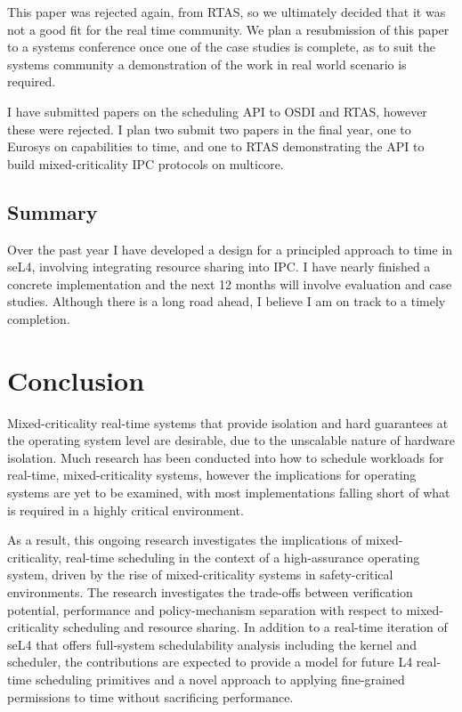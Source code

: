 This paper was rejected again, from \gls{RTAS}, so we ultimately decided that it was not a good fit for the real time community.
We plan a resubmission of this paper to a systems conference once one of the case studies is complete, as to suit the systems community a demonstration of the work in real world scenario is required.

I have submitted papers on the scheduling  API to OSDI and \gls{RTAS}, however these were rejected.
I plan two submit two papers in the final year, one to Eurosys on capabilities to time, and one to \gls{RTAS} demonstrating the API to build mixed-criticality IPC protocols on multicore.

\subsection{Summary}

Over the past year I have developed a design for a principled approach to time in seL4, involving integrating resource sharing into \gls{IPC}.
I have nearly finished a concrete implementation and the next 12 months will involve evaluation and case studies.
Although there is a long road ahead, I believe I am on track to a timely completion.

\section{Conclusion}

Mixed-criticality real-time systems that provide isolation and hard guarantees at the operating system level are desirable, due to the unscalable nature of hardware isolation.
Much research has been conducted into how to schedule workloads for real-time, mixed-criticality systems, however the implications for operating systems are yet to be examined, with most implementations falling short of what is required in a highly critical environment.

As a result, this ongoing research investigates the implications of mixed-criticality, real-time scheduling in the context of a high-assurance operating system, driven by the rise of mixed-criticality systems in safety-critical environments.
The research investigates the trade-offs between verification potential, performance and policy-mechanism separation with respect to mixed-criticality scheduling and resource sharing.
In addition to a real-time iteration of seL4 that offers full-system schedulability analysis including the kernel and scheduler, the contributions are expected to provide a model for future L4 real-time scheduling primitives and a novel approach to applying fine-grained permissions to time without sacrificing performance.


